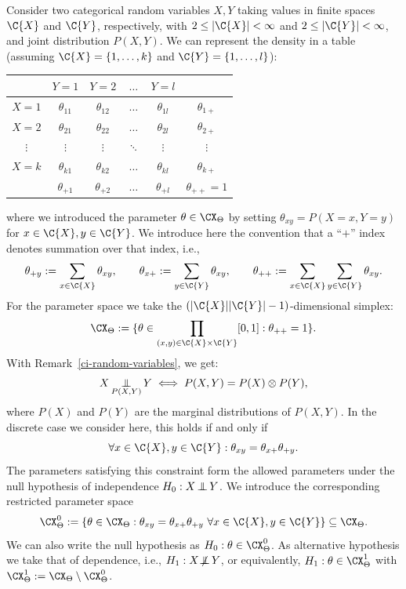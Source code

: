 Consider two categorical random variables $X,Y$ taking values in finite spaces $\C{X}$ and $\C{Y}$,
respectively, with $2 \le |\C{X}| < \infty$ and $2 \le |\C{Y}| < \infty$, and joint distribution $P(X,Y)$.
We can represent the density in a table (assuming $\C{X} = \{1,\dots,k\}$ and $\C{Y} = \{1,\dots,l\}$):
\begin{center}\begin{tabular}{c|cccc|c}
  & $Y=1$         & $Y=2$ & $\dots$ & $Y=l$ \\
  \hline
  $X=1$ & $\theta_{11}$      & $\theta_{12}$      & $\dots$ & $\theta_{1l}$ & $\theta_{1+}$\\
  $X=2$ & $\theta_{21}$      & $\theta_{22}$      & $\dots$ & $\theta_{2l}$ & $\theta_{2+}$\\
  $\vdots$ & $\vdots$     & $\vdots$       & $\ddots$ & $\vdots$  & $\vdots$ \\
  $X=k$ & $\theta_{k1}$      & $\theta_{k2}$      & $\dots$ & $\theta_{kl}$ & $\theta_{k+}$ \\
  \hline
  & $\theta_{+ 1}$ & $\theta_{+ 2}$ & $\dots$ & $\theta_{+ l}$ & $\theta_{++}=1$\\
\end{tabular}\end{center}
where we introduced the parameter $\theta \in \CX_\Theta$ by setting $\theta_{xy} = P(X=x,Y=y)$ for
$x \in \C{X}, y \in \C{Y}$.
We introduce here the convention that a ``$+$'' index denotes summation over that index, i.e.,
$$\theta_{+ y} := \sum_{x\in\C{X}} \theta_{xy}, \qquad \theta_{x+} := \sum_{y\in\C{Y}} \theta_{xy}, \qquad \theta_{++} := \sum_{x\in\C{X}}\sum_{y\in\C{Y}} \theta_{xy}.$$
For the parameter space we take the $(|\C{X}||\C{Y}|-1)$-dimensional simplex:
$$\CX_\Theta := \{ \theta \in \prod_{(x,y)\in\C{X}\times\C{Y}} [0,1] : \theta_{+ +} = 1 \}.$$
With Remark~\ref{ci-random-variables}, we get:
$$X \operatorname*{\perp\mkern-11mu\perp}_{P(X,Y)} Y \iff P(X,Y) = P(X) \otimes P(Y),$$
where $P(X)$ and $P(Y)$ are the marginal distributions of $P(X,Y)$.
In the discrete case we consider here, this holds if and only if
$$\forall x \in \C{X}, y \in \C{Y}: \theta_{xy} = \theta_{x+} \theta_{+ y}.$$
The parameters satisfying this constraint form the allowed parameters under the
null hypothesis of independence $H_0 : X \operatorname*{\perp\mkern-11mu\perp} Y$.
We introduce the corresponding restricted parameter space
$$\CX_\Theta^0 := \{\theta \in \CX_\Theta : \theta_{xy} = \theta_{x+} \theta_{+ y} \ \forall x\in\C{X},y\in\C{Y} \} \subseteq \CX_\Theta.$$
We can also write the null hypothesis as $H_0 : \theta \in \CX_\Theta^0$.
As alternative hypothesis we take that of dependence, i.e., $H_1 : X \operatorname*{\not\mkern-2mu\perp\mkern-11mu\perp} Y$, or equivalently,
$H_1 : \theta \in \CX_\Theta^1$ with $\CX_\Theta^1 := \CX_\Theta \setminus \CX_\Theta^0$.

